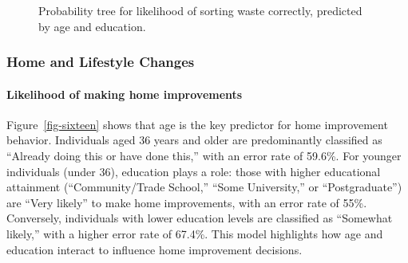 \documentclass[
  letterpaper,
  DIV=11,
  numbers=noendperiod]{scrartcl}
\let\oldparagraph\paragraph
\renewcommand{\paragraph}[1]{\oldparagraph{#1}\mbox{}}
\begin{document}
\begin{figure}


\caption{\label{fig-fifteen}Probability tree for likelihood of sorting
waste correctly, predicted by age and education.}

\end{figure}%

\subsubsection{Home and Lifestyle
Changes}\label{home-and-lifestyle-changes}

\paragraph{Likelihood of making home
improvements}\label{likelihood-of-making-home-improvements}

Figure~\ref{fig-sixteen} shows that age is the key predictor for home
improvement behavior. Individuals aged 36 years and older are
predominantly classified as ``Already doing this or have done this,''
with an error rate of 59.6\%. For younger individuals (under 36),
education plays a role: those with higher educational attainment
(``Community/Trade School,'' ``Some University,'' or ``Postgraduate'')
are ``Very likely'' to make home improvements, with an error rate of
55\%. Conversely, individuals with lower education levels are classified
as ``Somewhat likely,'' with a higher error rate of 67.4\%. This model
highlights how age and education interact to influence home improvement
decisions.
\end{document}
